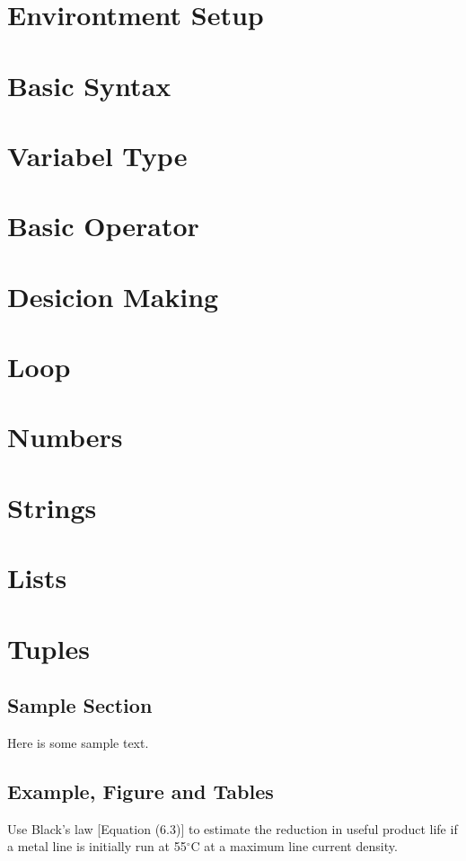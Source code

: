 \documentclass{wileySix}
\begin{document}
\chapter{Environtment Setup}

\chapter{Basic Syntax}

\chapter{Variabel Type}

\chapter{Basic Operator}

\chapter{Desicion Making}

\chapter{Loop}

\chapter{Numbers}

\chapter{Strings}

\chapter{Lists}


\chapter{Tuples}

\section{Sample Section}
Here is some sample text.

\section{Example, Figure and Tables}
\vskip6pt
\begin{example}
	Use Black's law [Equation (6.3)] to estimate the reduction in useful product
	life if a metal line is initially run at 55$^\circ$C at a maximum line
	current density.
\end{example}
\end{document}
